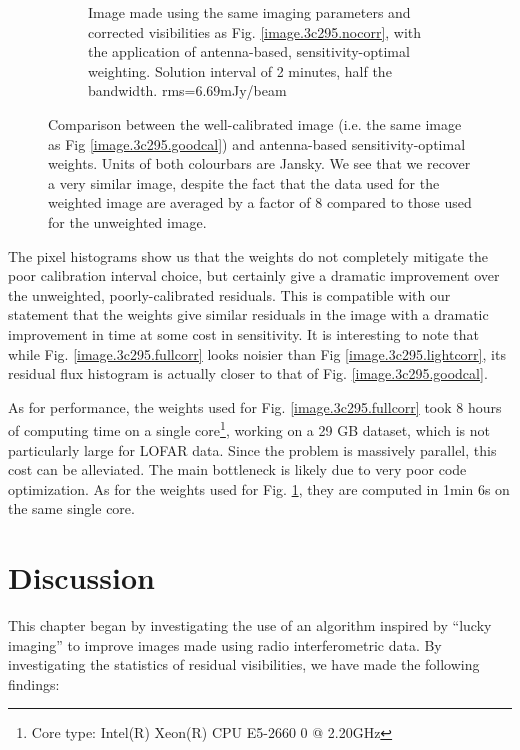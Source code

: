 \begin{figure}[h!]
\begin{subfigure}{.49\textwidth}
\caption{\label{image.3c295.antcorr} Image made using the same imaging parameters and corrected visibilities as Fig. \ref{image.3c295.nocorr}, with the application of antenna-based, sensitivity-optimal weighting. Solution interval of 2 minutes, half the bandwidth. rms=6.69mJy/beam}
\end{subfigure}
\caption{\label{image.twoRealImages}Comparison between the well-calibrated image (i.e. the same image as Fig \ref*{image.3c295.goodcal}) and antenna-based sensitivity-optimal weights.  {Units of both colourbars are Jansky}. We see that we recover a very similar image, despite the fact that the data used for the weighted image are averaged by a factor of 8 compared to those used for the unweighted image.}
\end{figure}

\pg
{The pixel histograms show us that the weights do not completely mitigate the poor calibration interval choice, but certainly give a dramatic improvement over the unweighted, poorly-calibrated residuals. This is compatible with our statement that the weights give similar residuals in the image with a dramatic improvement in time at some cost in sensitivity. It is interesting to note that while Fig. \ref{image.3c295.fullcorr} looks noisier than Fig \ref{image.3c295.lightcorr}, its residual flux histogram is actually closer to that of Fig. \ref{image.3c295.goodcal}.}

\pg
As for performance, the weights used for Fig. \ref*{image.3c295.fullcorr} took 8 hours of computing time on a single core\footnote{Core type: Intel(R) Xeon(R) CPU E5-2660 0 @ 2.20GHz}, working on a 29 GB dataset, which is not particularly large for LOFAR data. Since the problem is massively parallel, this cost can be alleviated. The main bottleneck is likely due to very poor code optimization. As for the weights used for Fig. \ref*{image.3c295.antcorr}, they are computed in 1min 6s on the same single core. 

\clearpage
\section{Discussion}

This chapter began by investigating the use of an algorithm inspired by ``lucky imaging'' to improve images made using radio interferometric data. By investigating the statistics of residual visibilities, we have made the following findings:

